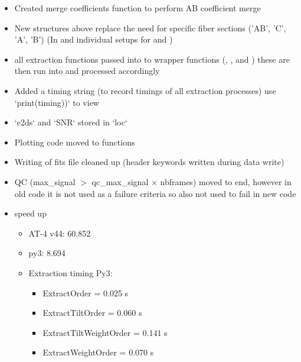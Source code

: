 \begin{itemize}
\item Created merge coefficients function to perform AB coefficient merge 

\item New structures above replace the need for specific fiber sections ('AB', 'C', 'A', 'B') (In  and individual setups for  and )

\item all extraction functions passed into  to wrapper functions (, ,  and ) these are then run into  and processed accordingly

\item Added a timing string (to record timings of all extraction processes) use `print(timing))` to view
    
\item `e2ds` and `SNR` stored in `loc`

\item Plotting code moved to  functions

\item Writing of fits file cleaned up (header keywords written during data write)

\item QC (max\_signal $>$ qc\_max\_signal $\times$ nbframes) moved to end, however in old code it is not used as a failure criteria so also not used to fail in new code

\item speed up
	\begin{itemize}
	\item AT-4 v44: 60.852
	\item py3: 8.694

	\item Extraction timing Py3:
		\begin{itemize}
		\item ExtractOrder = 0.025 s
		\item ExtractTiltOrder = 0.060 s
		\item ExtractTiltWeightOrder = 0.141 s
		\item ExtractWeightOrder = 0.070 s
         \end{itemize}


\end{itemize}
\end{itemize}
